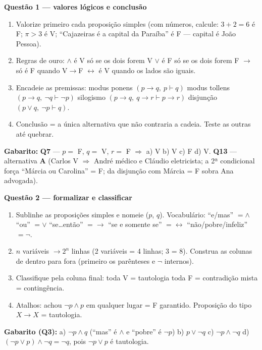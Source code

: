 \documentclass[11pt]{article}
\begin{document}
\vspace{4pt}
\begin{metodobox}
\textbf{\color{tealdeep}Questão 1 — valores lógicos e conclusão}
\begin{enumerate}[label=\arabic*., leftmargin=1.6em]
  \item Valorize primeiro cada proposição simples (com números, calcule: $3+2=6$ é F; $\pi>3$ é V; ``Cajazeiras é a capital da Paraíba'' é F — capital é João Pessoa).
  \item Regras de ouro: $\land$ é V só se os dois forem V \quad $\lor$ é F só se os dois forem F \quad $\to$ só é F quando V$\to$F \quad $\leftrightarrow$ é V quando os lados são iguais.
  \item Encadeie as premissas: modus ponens $(p\to q,\ p \vdash q)$ \quad modus tollens $(p\to q,\ \lnot q \vdash \lnot p)$ \quad silogismo $(p\to q,\ q\to r \vdash p\to r)$ \quad disjunção $(p\lor q,\ \lnot p \vdash q)$.
  \item Conclusão = a única alternativa que não contraria a cadeia. Teste as outras até quebrar.
\end{enumerate}
\textbf{Gabarito:} \textbf{Q7} — $p=$ F, $q=$ V, $r=$ F $\Rightarrow$ a) V \; b) V \; c) F \; d) V. \quad \textbf{Q13} — alternativa \textbf{A} (Carlos V $\Rightarrow$ André médico e Cláudio eletricista; a 2ª condicional força ``Márcia ou Carolina'' = F; da disjunção com Márcia = F sobra Ana advogada).
\end{metodobox}

\begin{metodobox}
\textbf{\color{tealdeep}Questão 2 — formalizar e classificar}
\begin{enumerate}[label=\arabic*., leftmargin=1.6em]
  \item Sublinhe as proposições simples e nomeie ($p$, $q$). Vocabulário: ``e/mas'' $=\land$ \quad ``ou'' $=\lor$ \quad ``se\ldots{}então'' $=\to$ \quad ``se e somente se'' $=\leftrightarrow$ \quad ``não/pobre/infeliz'' $=\lnot$.
  \item $n$ variáveis $\to 2^{n}$ linhas (2 variáveis = 4 linhas; 3 = 8). Construa as colunas de dentro para fora (primeiro os parênteses e $\lnot$ internos).
  \item Classifique pela coluna final: toda V = tautologia \quad toda F = contradição \quad mista = contingência.
  \item Atalhos: achou $\lnot p \land p$ em qualquer lugar = F garantido. Proposição do tipo $X \to X$ = tautologia.
\end{enumerate}
\textbf{Gabarito (Q3):} a) $\lnot p \land q$ (``mas'' é $\land$ e ``pobre'' é $\lnot p$) \; b) $p \lor \lnot q$ \; c) $\lnot p \land \lnot q$ \; d) $(\lnot p \lor p)\land\lnot q = \lnot q$, pois $\lnot p \lor p$ é tautologia.
\end{metodobox}
\end{document}
